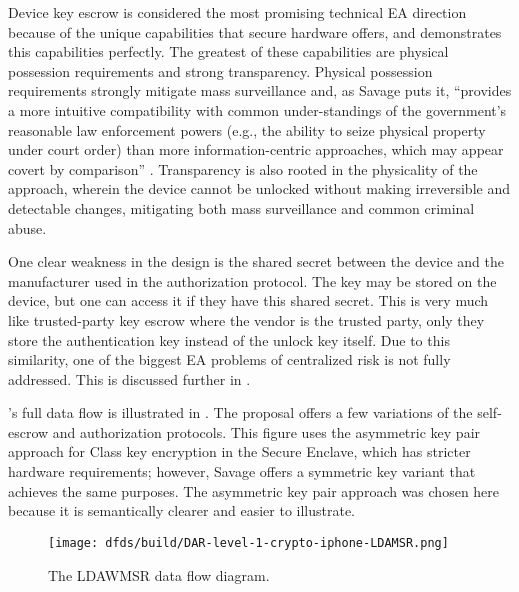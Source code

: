 Device key escrow is considered the most promising technical \ac{EA} direction because of the unique capabilities that
secure hardware offers, and \ldawmsr demonstrates this capabilities perfectly. The greatest of these capabilities are
physical possession requirements and strong transparency. Physical possession requirements strongly mitigate mass
surveillance and, as Savage puts it, ``provides a more intuitive compatibility with common under-standings of the
government’s reasonable law enforcement powers (e.g., the ability to seize physical property under court order) than
more information-centric approaches, which may appear covert by comparison'' \cite{savage_lawful_2018}. Transparency is
also rooted in the physicality of the approach, wherein the device cannot be unlocked without making irreversible and
detectable changes, mitigating both mass surveillance and common criminal abuse.

One clear weakness in the design is the shared secret between the device and the manufacturer used in the authorization
protocol. The key may be stored on the device, but one can access it if they have this shared secret. This is very much
like trusted-party key escrow where the vendor is the trusted party, only they store the authentication key instead of
the unlock key itself. Due to this similarity, one of the biggest \ac{EA} problems of centralized risk is not fully
addressed. This is discussed further in .

\ldawmsR's full data flow is illustrated in . The proposal offers a few variations of the
self-escrow and authorization protocols. This figure uses the asymmetric key pair approach for Class key encryption in
the Secure Enclave, which has stricter hardware requirements; however, Savage offers a symmetric key variant that
achieves the same purposes. The asymmetric key pair approach was chosen here because it is semantically clearer and
easier to illustrate.

\begin{figure}[p]
    \centering\CaptionFontSize
    \texttt{[image: dfds/build/DAR-level-1-crypto-iphone-LDAMSR.png]}
    \caption{The LDAWMSR data flow diagram.}
    \label{fig-dfd-ldawmsr}
\end{figure}

